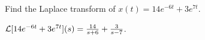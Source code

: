 \documentclass{ximera}
\begin{document}
\begin{exercise} \label{c13.1.0b}
Find the Laplace transform of $x(t)=14e^{-6t}+3e^{7t}$.

\begin{solution}
\ans ${\cal L}[14e^{-6t}+3e^{7t}](s) = \frac{14}{s+6} +
\frac{3}{s-7}$.

\end{solution}
\end{exercise}
\end{document}
